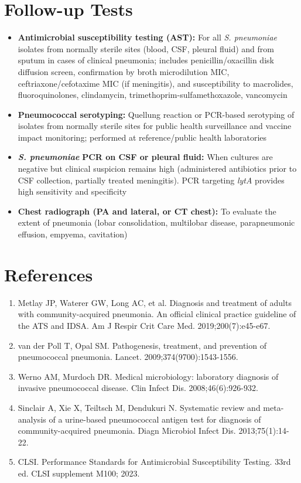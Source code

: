 \section*{Follow-up Tests}
\begin{itemize}
  \item \textbf{Antimicrobial susceptibility testing (AST):} For all \textit{S. pneumoniae} isolates from normally sterile sites (blood, CSF, pleural fluid) and from sputum in cases of clinical pneumonia; includes penicillin/oxacillin disk diffusion screen, confirmation by broth microdilution MIC, ceftriaxone/cefotaxime MIC (if meningitis), and susceptibility to macrolides, fluoroquinolones, clindamycin, trimethoprim-sulfamethoxazole, vancomycin
  \item \textbf{Pneumococcal serotyping:} Quellung reaction or PCR-based serotyping of isolates from normally sterile sites for public health surveillance and vaccine impact monitoring; performed at reference/public health laboratories
  \item \textit{\textbf{S. pneumoniae}} \textbf{PCR on CSF or pleural fluid:} When cultures are negative but clinical suspicion remains high (administered antibiotics prior to CSF collection, partially treated meningitis). PCR targeting \textit{lytA} provides high sensitivity and specificity
  \item \textbf{Chest radiograph (PA and lateral, or CT chest):} To evaluate the extent of pneumonia (lobar consolidation, multilobar disease, parapneumonic effusion, empyema, cavitation)
\end{itemize}

\section*{References}
\begin{enumerate}
  \item Metlay JP, Waterer GW, Long AC, et al. Diagnosis and treatment of adults with community-acquired pneumonia. An official clinical practice guideline of the ATS and IDSA. Am J Respir Crit Care Med. 2019;200(7):e45-e67.
  \item van der Poll T, Opal SM. Pathogenesis, treatment, and prevention of pneumococcal pneumonia. Lancet. 2009;374(9700):1543-1556.
  \item Werno AM, Murdoch DR. Medical microbiology: laboratory diagnosis of invasive pneumococcal disease. Clin Infect Dis. 2008;46(6):926-932.
  \item Sinclair A, Xie X, Teiltsch M, Dendukuri N. Systematic review and meta-analysis of a urine-based pneumococcal antigen test for diagnosis of community-acquired pneumonia. Diagn Microbiol Infect Dis. 2013;75(1):14-22.
  \item CLSI. Performance Standards for Antimicrobial Susceptibility Testing. 33rd ed. CLSI supplement M100; 2023.
\end{enumerate}

\clearpage
